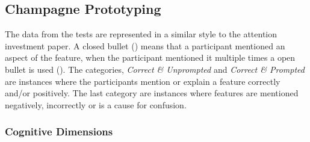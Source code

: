 \subsection{Champagne Prototyping}
\metasheep

The data from the tests are represented in a similar style to the attention investment paper\cite{blackwell2002first}. A closed bullet (\mn) means that a participant mentioned an aspect of the feature, when the participant mentioned it multiple times a open bullet is used (\mns). The categories, \textit{Correct \& Unprompted} and \textit{Correct \& Prompted} are instances where the participants mention or explain a feature correctly and/or positively. The last category are instances where features are mentioned negatively, incorrectly or is a cause for confusion.



\subsubsection{Cognitive Dimensions}
\metasheep

\begin{table}[H]
	\caption{Cognitive Dimensions Findings}
	\label{tab:cog-dim-findings}
\end{table}
